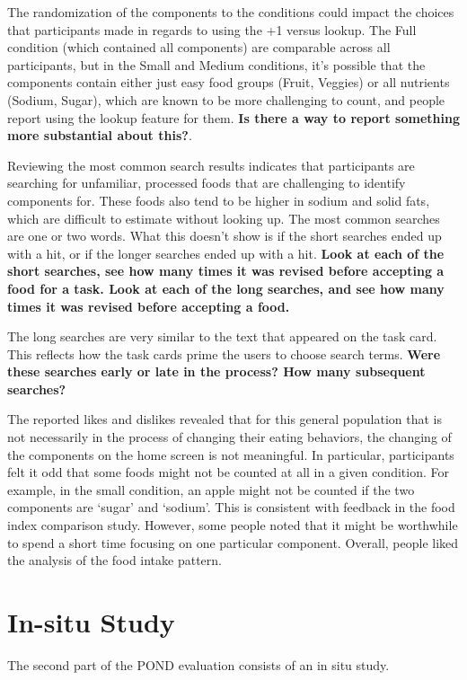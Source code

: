 The randomization of the components to the conditions could impact the choices that participants made in regards to using the +1 versus lookup. The Full condition (which contained all components) are comparable across all participants, but in the Small and Medium conditions, it's possible that the components contain either just easy food groups (Fruit, Veggies) or all nutrients (Sodium, Sugar), which are known to be more challenging to count, and people report using the lookup feature for them. \textbf{Is there a way to report something more substantial about this?}. 

Reviewing the most common search results indicates that participants are searching for unfamiliar, processed foods that are challenging to identify components for. These foods also tend to be higher in sodium and solid fats, which are difficult to estimate without looking up. The most common searches are one or two words. What this doesn't show is if the short searches ended up with a hit, or if the longer searches ended up with a hit. \textbf{Look at each of the short searches, see how many times it was revised before accepting a food for a task. Look at each of the long searches, and see how many times it was revised before accepting a food. } 

The long searches are very similar to the text that appeared on the task card. This reflects how the task cards prime the users to choose search terms. \textbf{Were these searches early or late in the process? How many subsequent searches?}

The reported likes and dislikes revealed that for this general population that is not necessarily in the process of changing their eating behaviors, the changing of the components on the home screen is not meaningful. In particular, participants felt it odd that some foods might not be counted at all in a given condition. For example, in the small condition, an apple might not be counted if the two components are `sugar' and `sodium'. This is consistent with feedback in the food index comparison study. However, some people noted that it might be worthwhile to spend a short time focusing on one particular component. Overall, people liked the analysis of the food intake pattern. 

\section{In-situ Study}

The second part of the POND evaluation consists of an in situ study. 

